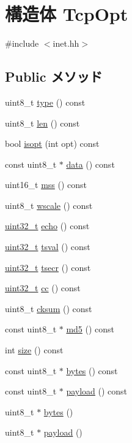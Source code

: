 \hypertarget{structNet_1_1TcpOpt}{
\section{構造体 TcpOpt}
\label{structNet_1_1TcpOpt}
}


{\ttfamily \#include $<$inet.hh$>$}\subsection*{Public メソッド}
\begin{DoxyCompactItemize}
\item 
uint8\_\-t \hyperlink{structNet_1_1TcpOpt_a7c3e8c8aa22970484617493a084000b9}{type} () const 
\item 
uint8\_\-t \hyperlink{structNet_1_1TcpOpt_a157a538f6c0e591c974744259b42d8f3}{len} () const 
\item 
bool \hyperlink{structNet_1_1TcpOpt_abb7301dd1b816fcfb0f9922c1cd7675c}{isopt} (int opt) const 
\item 
const uint8\_\-t $\ast$ \hyperlink{structNet_1_1TcpOpt_a40fe50b14bf164129156972247acb8e4}{data} () const 
\item 
uint16\_\-t \hyperlink{structNet_1_1TcpOpt_a491854d4ab28d4ea5f41179a126d14d3}{mss} () const 
\item 
uint8\_\-t \hyperlink{structNet_1_1TcpOpt_adfbec769c302b867b62db9af7657c03f}{wscale} () const 
\item 
\hyperlink{Type_8hh_a435d1572bf3f880d55459d9805097f62}{uint32\_\-t} \hyperlink{structNet_1_1TcpOpt_af0842b965063493bddbb1e8348321da5}{echo} () const 
\item 
\hyperlink{Type_8hh_a435d1572bf3f880d55459d9805097f62}{uint32\_\-t} \hyperlink{structNet_1_1TcpOpt_aeba716f8ccf8e3bd796ce39ec3bf4959}{tsval} () const 
\item 
\hyperlink{Type_8hh_a435d1572bf3f880d55459d9805097f62}{uint32\_\-t} \hyperlink{structNet_1_1TcpOpt_ab7cc35de244b5c22056e78886b23467c}{tsecr} () const 
\item 
\hyperlink{Type_8hh_a435d1572bf3f880d55459d9805097f62}{uint32\_\-t} \hyperlink{structNet_1_1TcpOpt_a0c5bd4685231a3185f123fccb2a8313d}{cc} () const 
\item 
uint8\_\-t \hyperlink{structNet_1_1TcpOpt_a0e5c67cd3adfdeed4e0e17fd18e8dc62}{cksum} () const 
\item 
const uint8\_\-t $\ast$ \hyperlink{structNet_1_1TcpOpt_ae647e910f0d658910b0dd25bb686ac46}{md5} () const 
\item 
int \hyperlink{structNet_1_1TcpOpt_ab8e4e3e2a7bf18888b71bdf9dda0770b}{size} () const 
\item 
const uint8\_\-t $\ast$ \hyperlink{structNet_1_1TcpOpt_aaa586eeaf354005403ca8e20f961b6c3}{bytes} () const 
\item 
const uint8\_\-t $\ast$ \hyperlink{structNet_1_1TcpOpt_a5f0d069ddb9d067af9e94963bd1fc7a2}{payload} () const 
\item 
uint8\_\-t $\ast$ \hyperlink{structNet_1_1TcpOpt_add4fb6fe45a091194dc9eac521194698}{bytes} ()
\item 
uint8\_\-t $\ast$ \hyperlink{structNet_1_1TcpOpt_a79ce21e3572e587b71de7af1ac640b6f}{payload} ()
\end{DoxyCompactItemize}


